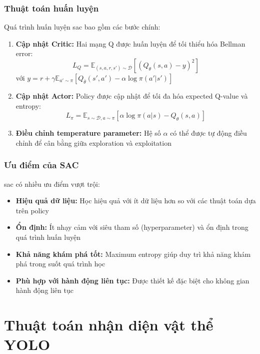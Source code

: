 \subsubsection{Thuật toán huấn luyện}
Quá trình huấn luyện \ac{sac} bao gồm các bước chính:
\begin{enumerate}
    \item \textbf{Cập nhật Critic:} Hai mạng Q được huấn luyện để tối thiểu hóa Bellman error:
    \begin{equation}
        L_Q = \mathbb{E}_{(s,a,r,s') \sim \mathcal{D}} \left[ (Q_\theta(s,a) - y)^2 \right]
    \end{equation}
    với $y = r + \gamma \mathbb{E}_{a' \sim \pi} [Q_{\bar{\theta}}(s',a') - \alpha \log \pi(a'|s')]$
    
    \item \textbf{Cập nhật Actor:} Policy được cập nhật để tối đa hóa expected Q-value và entropy:
    \begin{equation}
        L_\pi = \mathbb{E}_{s \sim \mathcal{D}, a \sim \pi} [\alpha \log \pi(a|s) - Q_\theta(s,a)]
    \end{equation}
    
    \item \textbf{Điều chỉnh temperature parameter:} Hệ số $\alpha$ có thể được tự động điều chỉnh để cân bằng giữa exploration và exploitation
\end{enumerate}

\subsubsection{Ưu điểm của SAC}
\ac{sac} có nhiều ưu điểm vượt trội:
\begin{itemize}
    \item \textbf{Hiệu quả dữ liệu:} Học hiệu quả với ít dữ liệu hơn so với các thuật toán dựa trên policy
    \item \textbf{Ổn định:} Ít nhạy cảm với siêu tham số (hyperparameter) và ổn định trong quá trình huấn luyện
    \item \textbf{Khả năng khám phá tốt:} Maximum entropy giúp duy trì khả năng khám phá trong suốt quá trình học
    \item \textbf{Phù hợp với hành động liên tục:} Được thiết kế đặc biệt cho không gian hành động liên tục
\end{itemize}

\section{Thuật toán nhận diện vật thể YOLO}
